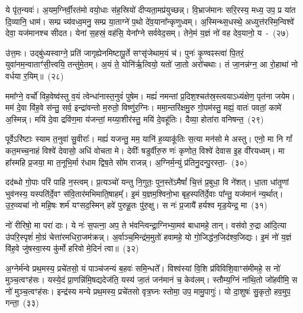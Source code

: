 ये पृ॑त॒न्यवः॑। अ॒यम॒ग्निर्वी॒रत॑मो वयो॒धाः स॑ह॒स्रियो॑ दीप्यता॒मप्र॑युच्छन्न्। वि॒भ्राज॑मानः सरि॒रस्य॒ मध्य॒ उप॒ प्र या॑त दि॒व्यानि॒ धाम॑। सम्प्र च्य॑वध्व॒मनु॒ सम्प्र या॒ताग्ने॑ प॒थो दे॑व॒याना᳚न्कृणुध्वम्। अ॒स्मिन्थ्स॒धस्थे॒ अध्युत्त॑रस्मि॒न्विश्वे॑ देवा॒ यज॑मानश्च सीदत। येना॑ स॒हस्रं॒ वह॑सि॒ येना᳚ग्ने सर्ववेद॒सम्। तेने॒मं य॒ज्ञं नो॑ वह देव॒यानो॒ य~-~(२७)\ip

उ॑त्त॒मः। उद्बु॑ध्यस्वाग्ने॒ प्रति॑ जागृह्येनमिष्टापू॒र्ते सꣳसृ॑जेथाम॒यं च॑। पुनः॑ कृ॒ण्वꣴस्त्वा॑ पि॒तरं॒ युवा॑नम॒न्वाताꣳ॑सी॒त्त्वयि॒ तन्तु॑मे॒तम्। अ॒यं ते॒ योनि॑र्\mbox{}ऋ॒त्वियो॒ यतो॑ जा॒तो अरो॑चथाः। तं जा॒नन्न॑ग्न॒ आ रो॒हाथा॑ नो वर्धया र॒यिम्॥~(२८)\ip

{\anuvakamend[{ध्रु॒वः स॒त्रं कृ॑णुते॒ यः स॒प्तत्रिꣳ॑शच्च}]}%

ममा᳚ग्ने॒ वर्चो॑ विह॒वेष्व॑स्तु व॒यं त्वेन्धा॑नास्त॒नुवं॑ पुषेम। मह्यं॑ नमन्तां प्र॒दिश॒श्चत॑स्र॒स्त्वया\-ऽ\-ध्य॑क्षेण॒ पृत॑ना जयेम। मम॑ दे॒वा वि॑ह॒वे स॑न्तु॒ सर्व॒ इन्द्रा॑वन्तो म॒रुतो॒ विष्णु॑र॒ग्निः। ममा॒न्तरि॑क्षमु॒रु गो॒पम॑स्तु॒ मह्यं॒ वातः॑ पवतां॒ कामे॑ अ॒स्मिन्न्। मयि॑ दे॒वा द्रवि॑ण॒मा य॑जन्तां॒ मय्या॒शीर॑स्तु॒ मयि॑ दे॒वहू॑तिः। दैव्या॒ होता॑रा वनिषन्त॒~(२९)\ip

पूर्वे\-ऽरि॑ष्टाः स्याम त॒नुवा॑ सु॒वीराः᳚। मह्यं॑ यजन्तु॒ मम॒ यानि॑ ह॒व्याकू॑तिः स॒त्या मन॑सो मे अस्तु। एनो॒ मा नि गां᳚ कत॒मच्च॒नाहं विश्वे॑ देवासो॒ अधि॑ वोचता मे। देवीः᳚ षडुर्वीरु॒रु णः॑ कृणोत॒ विश्वे॑ देवास इ॒ह वी॑रयध्वम्। मा हा᳚स्महि प्र॒जया॒ मा त॒नूभि॒र्मा र॑धाम द्विष॒ते सो॑म राजन्न्। अ॒ग्निर्म॒न्युं प्र॑तिनु॒दन्पु॒रस्ता॒-~(३०)\ip

दद॑ब्धो गो॒पाः परि॑ पाहि न॒स्त्वम्। प्र॒त्यञ्चो॑ यन्तु नि॒गुतः॒ पुन॒स्ते॑\-ऽमैषां᳚ चि॒त्तं प्र॒बुधा॒ वि ने॑शत्। धा॒ता धा॑तृ॒णां भुव॑नस्य॒ यस्पति॑र्दे॒वꣳ स॑वि॒तार॑मभिमाति॒षाहम्᳚। इ॒मं य॒ज्ञम॒श्विनो॒भा बृह॒स्पति॑र्दे॒वाः पा᳚न्तु॒ यज॑मानं न्य॒र्थात्। उ॒रु॒व्यचा॑ नो महि॒षः शर्म॑ यꣳसद॒स्मिन् हवे॑ पुरुहू॒तः पु॑रु॒क्षु। स नः॑ प्र॒जायै॑ हर्यश्व मृड॒येन्द्र॒ मा~(३१)\ip

नो॑ रीरिषो॒ मा परा॑ दाः। ये नः॑ स॒पत्ना॒ अप॒ ते भ॑वन्त्विन्द्रा॒ग्निभ्या॒मव॑ बाधामहे॒ तान्। वस॑वो रु॒द्रा आ॑दि॒त्या उ॑परि॒स्पृशं॑ मो॒ग्रं चेत्ता॑रमधिरा॒जम॑क्रन्न्। अ॒र्वाञ्च॒मिन्द्र॑म॒मुतो॑ हवामहे॒ यो गो॒जिद्ध॑न॒जिद॑श्व॒जिद्यः। इ॒मं नो॑ य॒ज्ञं वि॑ह॒वे जु॑षस्वा॒स्य कु॑र्मो हरिवो मे॒दिनं॑ त्वा॥~(३२)\ip

{\anuvakamend[{व॒नि॒ष॒न्त॒ पु॒रस्ता॒न्मा त्रिच॑त्वारिꣳशच्च}]}%

अ॒ग्नेर्म॑न्वे प्रथ॒मस्य॒ प्रचे॑तसो॒ यं पाञ्च॑जन्यं ब॒हवः॑ समि॒न्धते᳚। विश्व॑स्यां वि॒शि प्र॑विविशि॒वाꣳस॑मीमहे॒ स नो॑ मुञ्च॒त्वꣳह॑सः। यस्ये॒दं प्रा॒णन्नि॑मि॒षद्यदेज॑ति॒ यस्य॑ जा॒तं जन॑मानं च॒ केव॑लम्। स्तौम्य॒ग्निं ना॑थि॒तो जो॑हवीमि॒ स नो॑ मुञ्च॒त्वꣳह॑सः। इन्द्र॑स्य मन्ये प्रथ॒मस्य॒ प्रचे॑तसो वृत्र॒घ्नः स्तोमा॒ उप॒ मामु॒पागुः॑। यो दा॒शुषः॑ सु॒कृतो॒ हव॒मुप॒ गन्ता॒~(३३)\ip

